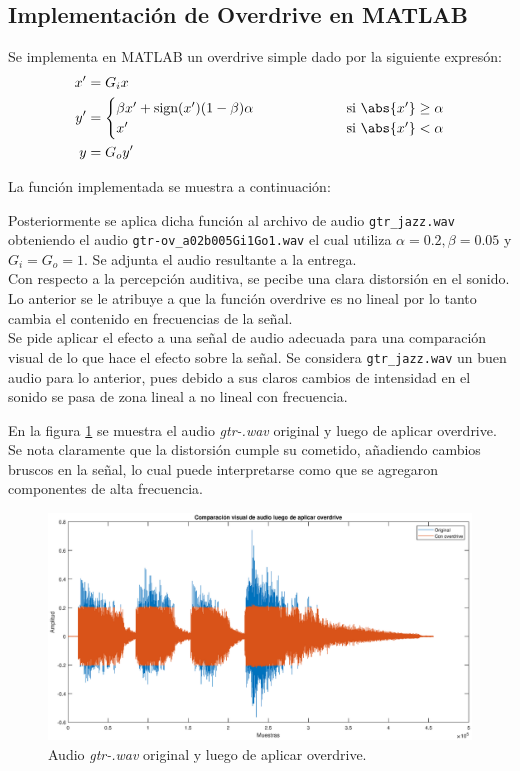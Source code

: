 \subsection{Implementación de Overdrive en MATLAB}


Se implementa en MATLAB un overdrive simple dado por la siguiente expresón:
\begin{align}
    x' &= G_i x \\ 
    y' &= \begin{cases}
    \beta x' + \text{sign}(x')(1-\beta) \alpha \hspace{2 cm} &\text{si }\abs{x'} \geq \alpha\\
    x' &\text{si }\abs{x'} < \alpha
    \end{cases}\\
    y &= G_o y'
\end{align}

La función implementada se muestra a continuación:



Posteriormente se aplica dicha función al archivo de audio \texttt{gtr\_jazz.wav} obteniendo el audio \texttt{gtr-ov\_a02b005Gi1Go1.wav} el cual utiliza $\alpha = 0.2, \beta = 0.05$ y $G_i = G_o = 1$. Se adjunta el audio resultante a la entrega. 
\\
Con respecto a la percepción auditiva, se pecibe una clara distorsión en el sonido. Lo anterior se le atribuye a que la función overdrive es no lineal por lo tanto cambia el contenido en frecuencias de la señal.
\\
\newline
Se pide aplicar el efecto a una señal de audio adecuada para una comparación visual de lo que hace el efecto sobre la señal. Se considera \texttt{gtr\_jazz.wav} un buen audio para lo anterior, pues debido a sus claros cambios de intensidad en el sonido se pasa de zona lineal a no lineal con frecuencia.

En la figura \ref{fig:p211} se muestra el audio \textit{gtr-.wav} original y luego de aplicar overdrive. Se nota claramente que la distorsión cumple su cometido, añadiendo cambios bruscos en la señal, lo cual puede interpretarse como que se agregaron componentes de alta frecuencia.

\begin{figure}[H]
    \centering
    \includegraphics[width = .8\linewidth]{Figuras/p211_comparacion-overdrive.eps}
    \caption{Audio \textit{gtr-.wav} original y luego de aplicar overdrive.}
    \label{fig:p211}
\end{figure}

